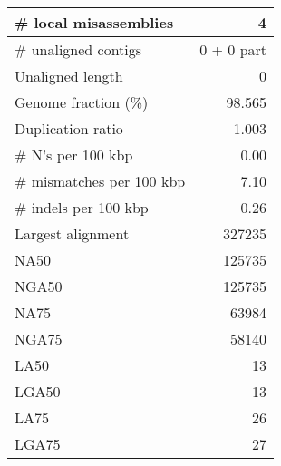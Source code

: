 \documentclass[12pt,a4paper]{article}
\begin{document}
\begin{table}[ht]
\begin{center}
\begin{tabular}{|l*{1}{|r}|}
\# local misassemblies & 4 \\ \hline
\# unaligned contigs & 0 + 0 part \\ \hline
Unaligned length & 0 \\ \hline
Genome fraction (\%) & 98.565 \\ \hline
Duplication ratio & 1.003 \\ \hline
\# N's per 100 kbp & 0.00 \\ \hline
\# mismatches per 100 kbp & 7.10 \\ \hline
\# indels per 100 kbp & 0.26 \\ \hline
Largest alignment & 327235 \\ \hline
NA50 & 125735 \\ \hline
NGA50 & 125735 \\ \hline
NA75 & 63984 \\ \hline
NGA75 & 58140 \\ \hline
LA50 & 13 \\ \hline
LGA50 & 13 \\ \hline
LA75 & 26 \\ \hline
LGA75 & 27 \\ \hline
\end{tabular}
\end{center}
\end{table}
\end{document}

